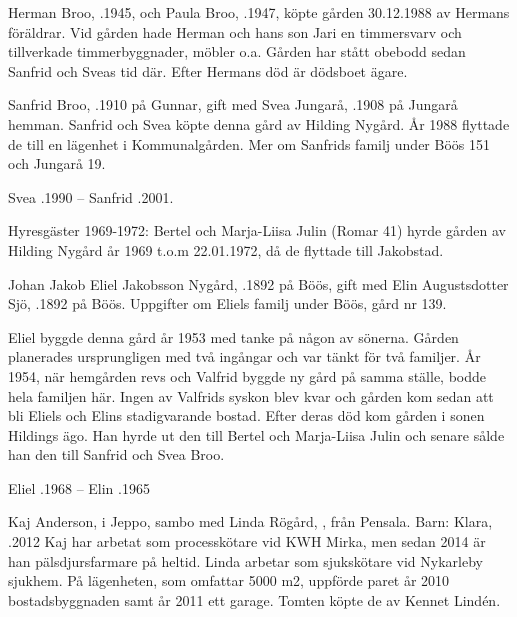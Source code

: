 
Herman Broo, .1945, och Paula Broo, .1947, köpte gården 30.12.1988 av Hermans föräldrar. Vid gården hade Herman och hans son Jari en timmersvarv och tillverkade timmerbyggnader, möbler o.a. Gården har stått obebodd sedan Sanfrid och Sveas tid där. Efter Hermans död är dödsboet ägare.


Sanfrid Broo, .1910 på Gunnar, gift med Svea Jungarå, .1908 på Jungarå hemman. Sanfrid och Svea köpte denna gård av Hilding Nygård. År 1988 flyttade de till en lägenhet i Kommunalgården. Mer om Sanfrids familj under Böös 151 och Jungarå 19.

Svea .1990  --  Sanfrid .2001.

Hyresgäster 1969-1972: Bertel och Marja-Liisa Julin (Romar 41) hyrde gården av  Hilding Nygård år 1969 t.o.m 22.01.1972, då de flyttade till Jakobstad.


Johan Jakob Eliel Jakobsson Nygård, .1892 på Böös, gift med Elin Augustsdotter Sjö, .1892 på Böös. Uppgifter om Eliels familj under Böös, gård nr 139.

Eliel byggde denna gård år 1953 med tanke på någon av sönerna. Gården planerades ursprungligen med två ingångar och var tänkt för två familjer. År 1954, när hemgården revs och Valfrid byggde ny gård på samma ställe, bodde hela familjen här. Ingen av Valfrids syskon blev kvar och gården kom sedan att bli Eliels och Elins stadigvarande bostad. Efter deras död kom gården i sonen Hildings ägo. Han hyrde ut den till Bertel och Marja-Liisa Julin och senare sålde han den till Sanfrid och Svea Broo.

Eliel .1968  --  Elin .1965




Kaj Anderson,  i Jeppo, sambo med Linda Rögård, , från Pensala.
Barn: Klara, .2012
Kaj har arbetat som processkötare vid KWH Mirka, men sedan 2014  är	han pälsdjursfarmare på heltid. Linda arbetar som sjukskötare vid Nykarleby sjukhem. På lägenheten, som omfattar 5000 m2, uppförde paret  år 2010 bostadsbyggnaden samt år 2011 ett garage. Tomten köpte de av Kennet Lindén.



